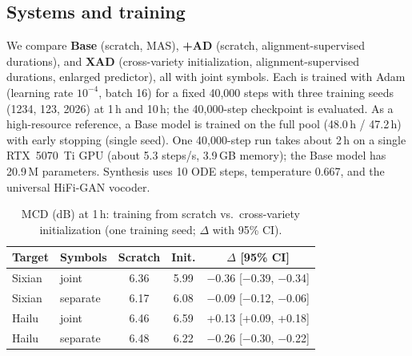 \documentclass[conference,a4paper]{IEEEtran}
\begin{document}
\subsection{Systems and training}
We compare \textbf{Base} (scratch, MAS), \textbf{+AD} (scratch, alignment-supervised durations), and \textbf{XAD} (cross-variety initialization, alignment-supervised durations, enlarged predictor), all with joint symbols. Each is trained with Adam (learning rate $10^{-4}$, batch 16) for a fixed 40{,}000 steps with three training seeds (1234, 123, 2026) at 1\,h and 10\,h; the 40{,}000-step checkpoint is evaluated. As a high-resource reference, a Base model is trained on the full pool (48.0\,h / 47.2\,h) with early stopping (single seed). One 40{,}000-step run takes about 2\,h on a single RTX~5070~Ti GPU (about 5.3 steps/s, 3.9\,GB memory); the Base model has 20.9\,M parameters. %
Synthesis uses 10 ODE steps, temperature 0.667, and the universal HiFi-GAN vocoder.

\begin{table}[t]
\centering
\caption{MCD (dB) at 1\,h: training from scratch vs.\ cross-variety initialization (one training seed; $\Delta$ with 95\% CI).}
\label{tab:transfer}
\footnotesize
\begin{tabular}{llccc}
\toprule
Target & Symbols & Scratch & Init. & $\Delta$ [95\% CI] \\
\midrule
Sixian & joint    & 6.36 & 5.99 & $-$0.36 [$-$0.39, $-$0.34] \\
Sixian & separate & 6.17 & 6.08 & $-$0.09 [$-$0.12, $-$0.06] \\
Hailu  & joint    & 6.46 & 6.59 & +0.13 [+0.09, +0.18] \\
Hailu  & separate & 6.48 & 6.22 & $-$0.26 [$-$0.30, $-$0.22] \\
\bottomrule
\end{tabular}
\end{table}
\end{document}

